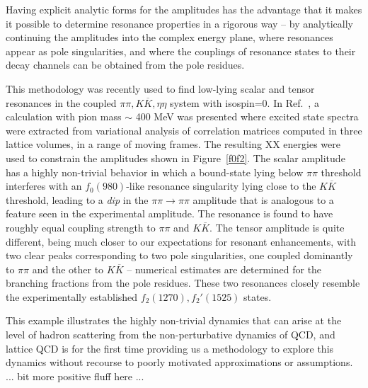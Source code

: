 {Having explicit analytic forms for the amplitudes has the advantage that it makes it possible to determine resonance properties in a rigorous way -- by analytically continuing the amplitudes into the complex energy plane, where resonances appear as pole singularities, and where the couplings of resonance states to their decay channels can be obtained from the pole residues.

This methodology was recently used to find low-lying scalar and tensor resonances in the coupled $\pi\pi, K\overline{K}, \eta\eta$ system with isospin=0. In Ref.~\cite{Briceno:2017qmb}, a calculation with pion mass $\sim$ 400 MeV was presented where excited state spectra were extracted from variational analysis of correlation matrices computed in three lattice volumes, in a range of moving frames. The resulting XX energies were used to constrain the amplitudes shown in Figure~\ref{f0f2}. The scalar amplitude has a highly non-trivial behavior in which a bound-state lying below $\pi\pi$ threshold interferes with an $f_0(980)$-like resonance singularity lying close to the $K\overline{K}$ threshold, leading to a \emph{dip} in the $\pi\pi \to \pi \pi$ amplitude that is analogous to a feature seen in the experimental amplitude. The resonance is found to have roughly equal coupling strength to $\pi\pi$ and $K\overline{K}$. The tensor amplitude is quite different, being much closer to our expectations for resonant enhancements, with two clear peaks corresponding to two pole singularities, one coupled dominantly to $\pi\pi$ and the other to $K\overline{K}$ -- numerical estimates are determined for the branching fractions from the pole residues. These two resonances closely resemble the experimentally established $f_2(1270), f_2'(1525)$ states.

This example illustrates the highly non-trivial dynamics that can arise at the level of hadron scattering from the non-perturbative dynamics of QCD, and lattice QCD is for the first time providing us a methodology to explore this dynamics without recourse to poorly motivated approximations or assumptions. {\color{red} ... bit more positive fluff here ...} 


}
